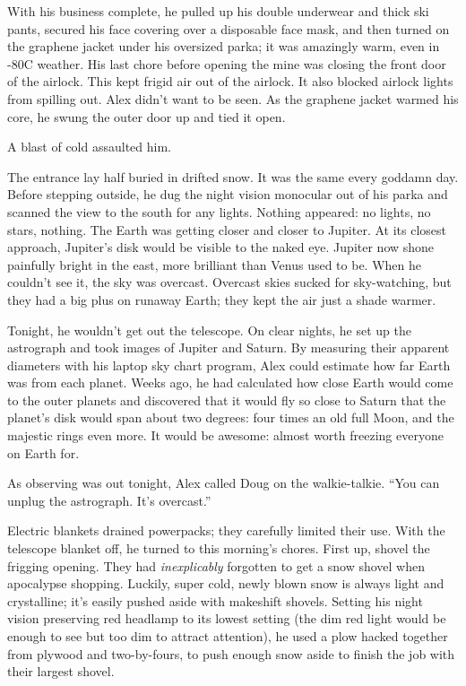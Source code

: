 With his business complete, he pulled up his double underwear and thick
ski pants, secured his face covering over a disposable face mask, and
then turned on the graphene jacket under his oversized parka; it was
amazingly warm, even in -80C weather. His last chore before opening the
mine was closing the front door of the airlock. This kept frigid air out
of the airlock. It also blocked airlock lights from spilling out. Alex
didn't want to be seen. As the graphene jacket warmed his core, he swung
the outer door up and tied it open.

A blast of cold assaulted him.

The entrance lay half buried in drifted snow. It was the same every
goddamn day. Before stepping outside, he dug the night vision monocular
out of his parka and scanned the view to the south for any lights.
Nothing appeared: no lights, no stars, nothing. The Earth was getting
closer and closer to Jupiter. At its closest approach, Jupiter's disk
would be visible to the naked eye. Jupiter now shone painfully bright in
the east, more brilliant than Venus used to be. When he couldn't see it,
the sky was overcast. Overcast skies sucked for sky-watching, but they
had a big plus on runaway Earth; they kept the air just a shade warmer.

Tonight, he wouldn't get out the telescope. On clear nights, he set up
the astrograph and took images of Jupiter and Saturn. By measuring their
apparent diameters with his laptop sky chart program, Alex could
estimate how far Earth was from each planet. Weeks ago, he had
calculated how close Earth would come to the outer planets and
discovered that it would fly so close to Saturn that the planet's disk
would span about two degrees: four times an old full Moon, and the
majestic rings even more. It would be awesome: almost worth freezing
everyone on Earth for.

As observing was out tonight, Alex called Doug on the walkie-talkie.
``You can unplug the astrograph. It's overcast.''

Electric blankets drained powerpacks; they carefully limited their use.
With the telescope blanket off, he turned to this morning's chores.
First up, shovel the frigging opening. They had \emph{inexplicably}
forgotten to get a snow shovel when apocalypse shopping. Luckily, super
cold, newly blown snow is always light and crystalline; it's easily
pushed aside with makeshift shovels. Setting his night vision preserving
red headlamp to its lowest setting (the dim red light would be enough to
see but too dim to attract attention), he used a plow hacked together
from plywood and two-by-fours, to push enough snow aside to finish the
job with their largest shovel.


